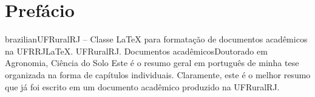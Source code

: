 \documentclass[tese, header, twoside, openright]{UFRuralRJ}
\begin{document}

\chapter*{Prefácio}

\blindtext[2]

\blindtext[2]

\blindtext[2]

\blindtext[2]

\def\tituloPT{UFRuralRJ -- Classe \LaTeX{} para formatação de documentos acadêmicos na UFRRJ}
\def\chavesPT{\LaTeX. UFRuralRJ. Documentos acadêmicos} %
\def\nivelPT{Doutorado em Agronomia, Ciência do Solo} %

\generalabstracttrue %
\begin{generalabstract}{brazilian}{\tituloPT}{\chavesPT}{\nivelPT} %
Este é o resumo geral em português de minha tese organizada na forma de capítulos individuais. Claramente, 
este é o melhor resumo que já foi escrito em um documento acadêmico produzido na UFRuralRJ.
\end{generalabstract}

\def\tituloEN{UFRuralRJ -- \LaTeX{} class for formatting academic documents at UFRRJ}
\def\chavesEN{\LaTeX. UFRuralRJ. Academical documents} %
\def\nivelEN{Doctor of Science in Agronomy, Soil Science} %
\end{document}
